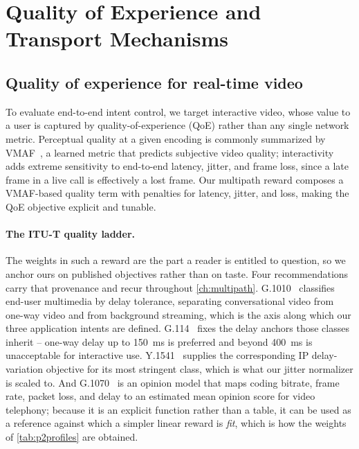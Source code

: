 \section{Quality of Experience and Transport Mechanisms}
\label{sec:background:qoe}

\subsection{Quality of experience for real-time video}
To evaluate end-to-end intent control, we target interactive video, whose value to a user is captured by 
quality-of-experience (QoE) rather than any single network metric. Perceptual quality at a given encoding 
is commonly summarized by VMAF~\cite{VMAF2016}, a learned metric that predicts subjective video quality; 
interactivity adds extreme sensitivity to end-to-end latency, jitter, and frame loss, since a late frame in a live 
call is effectively a lost frame. Our multipath reward composes a VMAF-based quality term with penalties for 
latency, jitter, and loss, making the QoE objective explicit and tunable.

\paragraph{The ITU-T quality ladder.} The weights in such a reward are the part a reader is entitled to
question, so we anchor ours on published objectives rather than on taste. Four recommendations carry
that provenance and recur throughout \cref{ch:multipath}. G.1010~\cite{ITUG1010} classifies end-user
multimedia by delay tolerance, separating conversational video from one-way video and from
background streaming, which is the axis along which our three application intents are defined.
G.114~\cite{ITUG114} fixes the delay anchors those classes inherit -- one-way delay up to
\SI{150}{\milli\second} is preferred and beyond \SI{400}{\milli\second} is unacceptable for
interactive use. Y.1541~\cite{ITUY1541} supplies the corresponding IP delay-variation objective for its
most stringent class, which is what our jitter normalizer is scaled to. And G.1070~\cite{ITUG1070} is
an opinion model that maps coding bitrate, frame rate, packet loss, and delay to an estimated mean
opinion score for video telephony; because it is an explicit function rather than a table, it can be
used as a reference against which a simpler linear reward is \emph{fit}, which is how the weights of
\cref{tab:p2profiles} are obtained.

